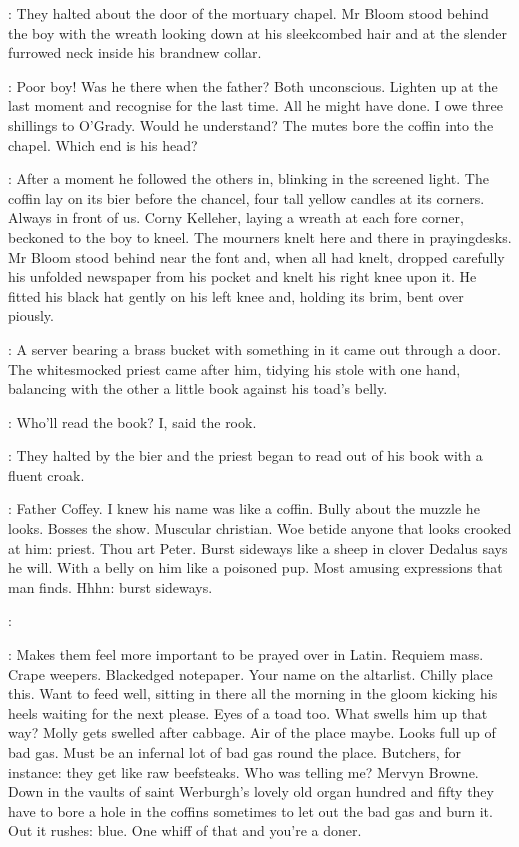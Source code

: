 :
They halted about the door of the mortuary chapel.
Mr Bloom stood behind the boy with the wreath
looking down at his sleekcombed hair and
at the slender furrowed neck inside his brandnew collar.

\BloomInt:
Poor boy!
Was he there when the father?
Both unconscious.
Lighten up at the last moment and recognise for the last time.
All he might have done.
I owe three shillings to O'Grady.
Would he understand?
The mutes bore the coffin into the chapel.
Which end is his head?

:
After a moment he followed the others in,
blinking in the screened light.
The coffin lay on its bier before the chancel,
four tall yellow candles at its corners.
Always in front of us.
Corny Kelleher, laying a wreath at each fore corner,
beckoned to the boy to kneel.
The mourners knelt here and there in prayingdesks.
Mr Bloom stood behind near the font
and, when all had knelt,
dropped carefully his unfolded newspaper from his pocket
and knelt his right knee upon it.
He fitted his black hat gently on his left knee
and, holding its brim, bent over piously.

:
A server bearing a brass bucket with something in it came out through a door.
The whitesmocked priest came after him,
tidying his stole with one hand,
balancing with the other a little book against his toad's belly.

\BloomInt:
Who'll read the book?
I, said the rook.

:
They halted by the bier
and the priest began to read out of his book
with a fluent croak.

\BloomInt:
Father Coffey.
I knew his name was like a coffin.
Bully about the muzzle he looks.
Bosses the show.
Muscular christian.
Woe betide anyone that looks crooked at him:
priest.
Thou art Peter.
Burst sideways like a sheep in clover
Dedalus says he will.
With a belly on him like a poisoned pup.
Most amusing expressions that man finds.
Hhhn:
burst sideways.%

\coffey:

\BloomInt:
Makes them feel more important to be prayed over in Latin.
Requiem mass.
Crape weepers.
Blackedged notepaper.
Your name on the altarlist.
Chilly place this.
Want to feed well, sitting in there all the morning
in the gloom kicking his heels
waiting for the next please.
Eyes of a toad too.
What swells him up that way?
Molly gets swelled after cabbage.
Air of the place maybe.
Looks full up of bad gas.
Must be an infernal lot of bad gas round the place.
Butchers, for instance:
they get like raw beefsteaks.
Who was telling me?
Mervyn Browne.
Down in the vaults of saint Werburgh's
lovely old organ hundred and fifty
they have to bore a hole in the coffins
sometimes to let out the bad gas and burn it.
Out it rushes:
blue.
One whiff of that and you're a doner.

